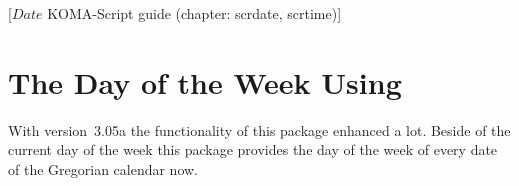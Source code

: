 %
%
%
%
%
%
%
%
% 
%
%
%
%

                 [$Date$
                  KOMA-Script guide (chapter: scrdate, scrtime)]


\chapter{The Day of the Week Using }
\BeginIndexGroup
{}

With version~3.05a the functionality of this package enhanced a lot. Beside of
the current day of the week this package provides the
day of the week of every date of the Gregorian calendar now.

